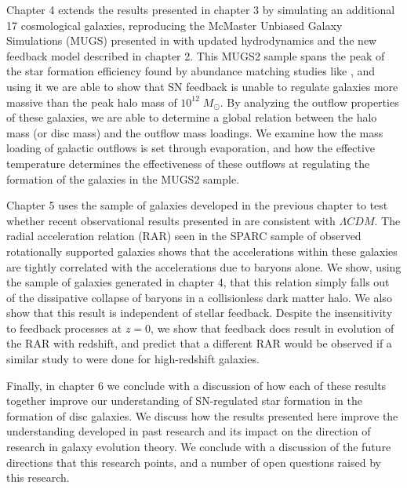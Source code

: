 Chapter 4 extends the results presented in chapter 3 by simulating an additional
17 cosmological galaxies, reproducing the McMaster Unbiased Galaxy Simulations
(MUGS) presented in \citet{Stinson2010} with updated hydrodynamics and the new
feedback model described in chapter 2.  This MUGS2 sample spans the peak of the
star formation efficiency found by abundance matching studies like
\citet{Moster2013}, and using it we are able to show that SN feedback is unable
to regulate galaxies more massive than the peak halo mass of $10^{12}\;M_\odot$.
By analyzing the outflow properties of these galaxies, we are able to determine
a global relation between the halo mass (or disc mass) and the outflow mass
loadings.  We examine how the mass loading of galactic outflows is set through
evaporation, and how the effective temperature determines the effectiveness of
these outflows at regulating the formation of the galaxies in the MUGS2 sample.

Chapter 5 uses the sample of galaxies developed in the previous chapter to
test whether recent observational results presented in \citet{McGaugh2016}
are consistent with $\Lambda CDM$.  The radial acceleration relation (RAR) seen in
the SPARC sample \citep{Lelli2016b} of observed rotationally supported galaxies
shows that the accelerations within these galaxies are tightly correlated 
with the accelerations due to baryons alone.  We show, using the sample of
galaxies generated in chapter 4, that this relation simply falls out of the
dissipative collapse of baryons in a collisionless dark matter halo.  We also
show that this result is independent of stellar feedback.  Despite the insensitivity
to feedback processes at $z=0$, we show that feedback does result in evolution
of the RAR with redshift, and predict that a different RAR would be observed if
a similar study to \citet{Lelli2016b} were done for high-redshift galaxies.

Finally, in chapter 6 we conclude with a discussion of how each of these results
together improve our understanding of SN-regulated star formation in the
formation of disc galaxies.  We discuss how the results presented here improve
the understanding developed in past research and its impact on the direction of
research in galaxy evolution theory.  We conclude with a discussion of the
future directions that this research points, and a number of open questions
raised by this research.



